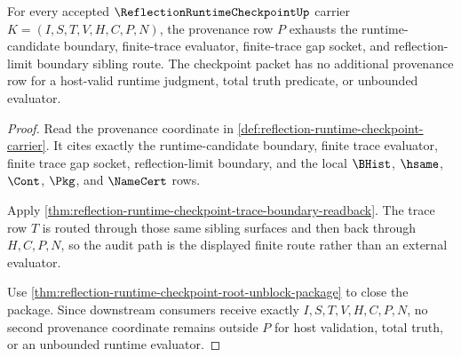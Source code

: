 \begin{theorem}
\label{thm:reflection-runtime-checkpoint-audit-provenance-exhaustion}
For every accepted $\ReflectionRuntimeCheckpointUp$ carrier $K=(I,S,T,V,H,C,P,N)$, the provenance row $P$ exhausts the runtime-candidate boundary, finite-trace evaluator, finite-trace gap socket, and reflection-limit boundary sibling route. The checkpoint packet has no additional provenance row for a host-valid runtime judgment, total truth predicate, or unbounded evaluator.
\end{theorem}
\begin{proof}
Read the provenance coordinate in \autoref{def:reflection-runtime-checkpoint-carrier}. It cites exactly the runtime-candidate boundary, finite trace evaluator, finite trace gap socket, reflection-limit boundary, and the local $\BHist$, $\hsame$, $\Cont$, $\Pkg$, and $\NameCert$ rows.

Apply \autoref{thm:reflection-runtime-checkpoint-trace-boundary-readback}. The trace row $T$ is routed through those same sibling surfaces and then back through $H,C,P,N$, so the audit path is the displayed finite route rather than an external evaluator.

Use \autoref{thm:reflection-runtime-checkpoint-root-unblock-package} to close the package. Since downstream consumers receive exactly $I,S,T,V,H,C,P,N$, no second provenance coordinate remains outside $P$ for host validation, total truth, or an unbounded runtime evaluator.
\end{proof}

